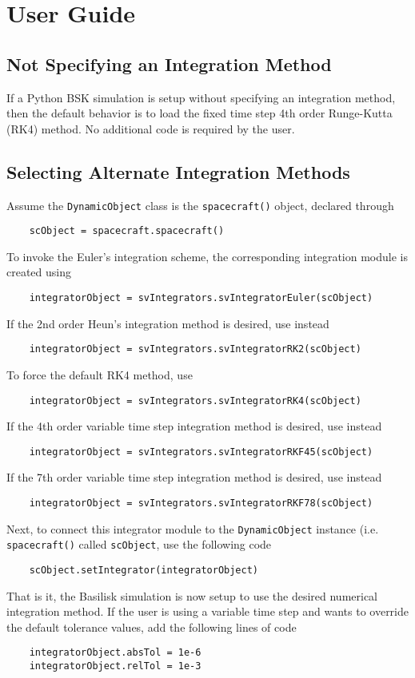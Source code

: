 
\section{User Guide}

\subsection{Not Specifying an Integration Method}
If a Python BSK simulation is setup without specifying an integration method, then the default behavior is to load the fixed time step 4th order Runge-Kutta (RK4) method.  No additional code is required by the user.


\subsection{Selecting Alternate Integration Methods}
Assume the {\tt DynamicObject} class is the {\tt spacecraft()} object, declared through
\begin{verbatim}
	scObject = spacecraft.spacecraft()
\end{verbatim}
To invoke the Euler's  integration scheme, the corresponding integration module is created using
\begin{verbatim}
	integratorObject = svIntegrators.svIntegratorEuler(scObject)
\end{verbatim}
If the 2nd order Heun's integration method is desired, use instead
\begin{verbatim}
	integratorObject = svIntegrators.svIntegratorRK2(scObject)
\end{verbatim}
To force the default RK4 method, use
\begin{verbatim}
	integratorObject = svIntegrators.svIntegratorRK4(scObject)
\end{verbatim}
If the 4th order variable time step integration method is desired, use instead
\begin{verbatim}
	integratorObject = svIntegrators.svIntegratorRKF45(scObject)
\end{verbatim}
If the 7th order variable time step integration method is desired, use instead
\begin{verbatim}
	integratorObject = svIntegrators.svIntegratorRKF78(scObject)
\end{verbatim}

Next, to connect this integrator module to the {\tt DynamicObject} instance (i.e. {\tt spacecraft()} called {\tt scObject}, use the following code
\begin{verbatim}
	scObject.setIntegrator(integratorObject)
\end{verbatim}
That is it, the Basilisk simulation is now setup to use the desired numerical  integration method. If the user is using a variable time step and wants to override the default tolerance values, add the following lines of code
\begin{verbatim}
	integratorObject.absTol = 1e-6
	integratorObject.relTol = 1e-3
\end{verbatim}

